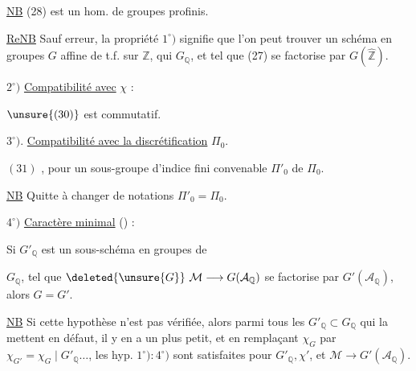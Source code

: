 \uline{NB} (28) est un hom. de groupes profinis.

\uline{ReNB} Sauf erreur, la propriété \(1^\circ)\) signifie que l'on peut trouver un schéma en groupes \(G\) affine de t.f. sur \(\mathbb{Z}\), qui  \(G_{\mathbb{Q}}\), et tel que (27) se factorise par \(G(\widehat{\mathbb{Z}})\).

\(2^\circ)\) \uline{Compatibilité avec} \(\chi\) :

\(\unsure{(30)}\)
est commutatif.

\(3^\circ)\). \uline{Compatibilité avec la discrétification} \(\Pi_0\).

\((31)\)
,
pour un sous-groupe d'indice fini convenable \(\Pi'_0\) de \(\Pi_0\).

\uline{NB} Quitte à changer de notations  \(\Pi'_0=\Pi_0\).

\(4^\circ)\) \uline{Caractère minimal} () :

Si \(G'_{\mathbb{Q}}\) est un sous-schéma en groupes de

\(G_{\mathbb{Q}}\), tel que \(\deleted{\unsure{G}}\ \mathcal{M}\longrightarrow G(\mathcal{A}_{\mathbb{Q}})\) se factorise par \(G'(\mathcal{A}_{\mathbb{Q}})\), alors \(G=G'\).

\uline{NB} Si cette hypothèse n'est pas vérifiée, alors parmi tous les \(G'_{\mathbb{Q}}\subset G_{\mathbb{Q}}\) qui la mettent en défaut, il y en a un  plus petit, et en remplaçant \(\chi_G\) par \(\chi_{G'}=\chi_G\mid G'_{\mathbb{Q}}\ldots\), les hyp. \(1^\circ):4^\circ)\) sont satisfaites pour \(G'_{\mathbb{Q}},\chi'\), et \(\mathcal{M}\longrightarrow G'(\mathcal{A}_{\mathbb{Q}})\).

